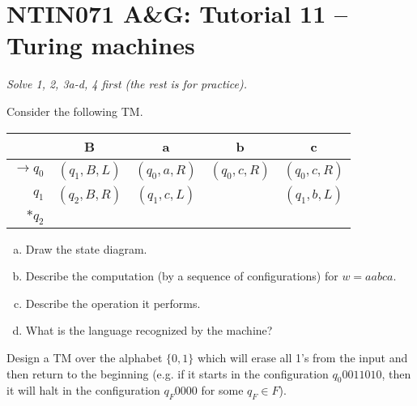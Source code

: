 \documentclass[a4paper,12pt]{amsart}
\begin{document}

\section*{NTIN071 A\&G: Tutorial 11 -- Turing machines}


\medskip

\noindent\emph{Solve 1, 2, 3a-d, 4  first (the rest is for practice).}

\medskip


\medskip\begin{problem}
    
    Consider the following TM.
    \vspace{-9pt}
    \begin{table}[h]
        \begin{tabular}{r|cccc}
        & B   & a    & b    &  c  \\ \hline
        $\to q_0$ & $(q_1, B, L)$ & $(q_0, a, R)$ & $(q_0, c, R)$ & $(q_0, c, R)$ \\
        $q_1$ & $(q_2, B, R)$ & $(q_1, c, L)$ &  & $(q_1, b, L)$ \\
        $\ast q_2$  &              &              &              &             
        \end{tabular}
    \end{table}

    \vspace{-24pt}    
    \begin{multicols}{2}        
        \begin{enumerate}[(a)]
            \item Draw the state diagram.
            \item Describe the computation (by a sequence of configurations) for $w=aabca$.
            \item Describe the operation it performs.
            \item What is the language recognized by the machine?
        \end{enumerate} 
    \end{multicols}
    
\end{problem}
    
    
\medskip\begin{problem}

    Design a TM over the alphabet $\{0,1\}$ which will erase all 1's from the input and then return to the beginning (e.g. if it starts in the configuration $q_0 0011010$, then it will halt in the configuration $q_F 0000$ for some $q_F\in F$).

\end{problem}
    
\end{document}
